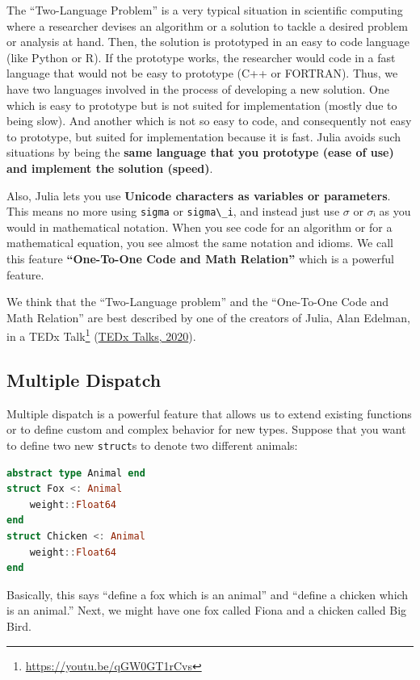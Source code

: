 \documentclass[
  notoc %
]{tufte-book}
\DeclareRobustCommand{\href}[2]{#2\footnote{\url{#1}}}
\newcommand{\passthrough}[1]{#1}
\begin{document}
The ``Two-Language Problem'' is a very typical situation in scientific
computing where a researcher devises an algorithm or a solution to
tackle a desired problem or analysis at hand. Then, the solution is
prototyped in an easy to code language (like Python or R). If the
prototype works, the researcher would code in a fast language that would
not be easy to prototype (C++ or FORTRAN). Thus, we have two languages
involved in the process of developing a new solution. One which is easy
to prototype but is not suited for implementation (mostly due to being
slow). And another which is not so easy to code, and consequently not
easy to prototype, but suited for implementation because it is fast.
Julia avoids such situations by being the \textbf{same language that you
prototype (ease of use) and implement the solution (speed)}.

Also, Julia lets you use \textbf{Unicode characters as variables or
parameters}. This means no more using \passthrough{\lstinline!sigma!} or
\passthrough{\lstinline!sigma\_i!}, and instead just use \(σ\) or \(σᵢ\)
as you would in mathematical notation. When you see code for an
algorithm or for a mathematical equation, you see almost the same
notation and idioms. We call this feature \textbf{``One-To-One Code and
Math Relation''} which is a powerful feature.

We think that the ``Two-Language problem'' and the ``One-To-One Code and
Math Relation'' are best described by one of the creators of Julia, Alan
Edelman, in a \href{https://youtu.be/qGW0GT1rCvs}{TEDx Talk}
(\protect\hyperlink{ref-tedxtalksProgrammingLanguageHeal2020}{TEDx
Talks, 2020}).

\hypertarget{sec:multiple_dispatch}{%
\subsection{Multiple Dispatch}\label{sec:multiple_dispatch}}

Multiple dispatch is a powerful feature that allows us to extend
existing functions or to define custom and complex behavior for new
types. Suppose that you want to define two new
\passthrough{\lstinline!struct!}s to denote two different animals:

\begin{lstlisting}[language=Julia]
abstract type Animal end
struct Fox <: Animal
    weight::Float64
end
struct Chicken <: Animal
    weight::Float64
end
\end{lstlisting}

Basically, this says ``define a fox which is an animal'' and ``define a
chicken which is an animal.'' Next, we might have one fox called Fiona
and a chicken called Big Bird.
\end{document}
